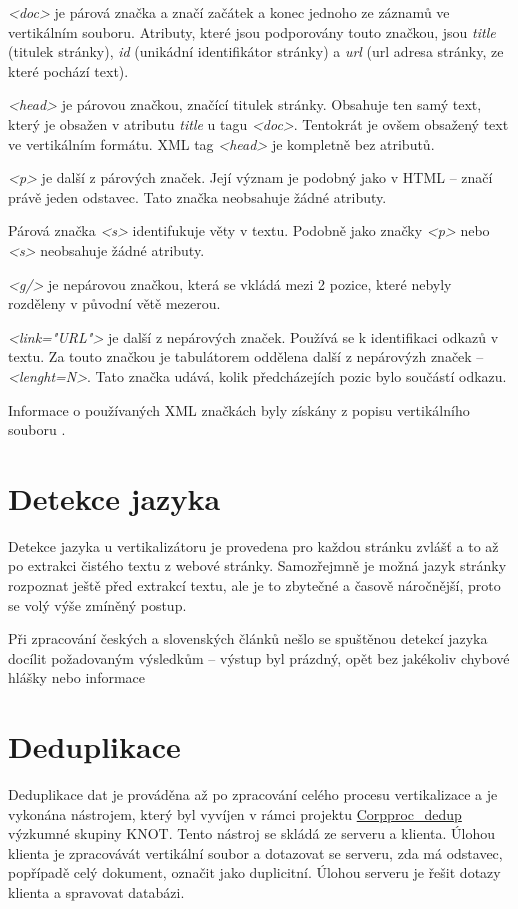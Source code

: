 \textit{<doc>} je párová značka a značí začátek a konec jednoho ze záznamů ve vertikálním souboru.
Atributy, které jsou podporovány touto značkou, jsou \textit{title} (titulek stránky),
\textit{id} (unikádní identifikátor stránky) a \textit{url} (url adresa stránky, ze které pochází text).

\textit{<head>} je párovou značkou, značící titulek stránky. Obsahuje ten samý text, který je obsažen v atributu
\textit{title} u tagu \textit{<doc>}. Tentokrát je ovšem obsažený text ve vertikálním formátu. XML tag
\textit{<head>} je kompletně bez atributů.

\textit{<p>} je další z párových značek. Její význam je podobný jako v HTML -- značí právě jeden odstavec.
Tato značka neobsahuje žádné atributy.

Párová značka \textit{<s>} identifukuje věty v textu. Podobně jako značky \textit{<p>} nebo \textit{<s>}
neobsahuje žádné atributy.

\textit{<g/>} je nepárovou značkou, která se vkládá mezi 2 pozice, které nebyly rozděleny v původní větě
mezerou.

\textit{<link="URL"\textgreater} je další z nepárových značek. Používá se k identifikaci odkazů v textu. Za touto
značkou je tabulátorem oddělena další z nepárovýzh značek -- \textit{<lenght=N>}. Tato značka
udává, kolik předcházejích pozic bylo součástí odkazu.

Informace o používaných XML značkách byly získány z popisu vertikálního souboru \cite{VERTIKAL}.

\section{Detekce jazyka}
Detekce jazyka u vertikalizátoru je provedena pro každou stránku zvlášť a to až po extrakci čistého textu z webové stránky.
Samozřejmně je možná jazyk stránky rozpoznat ještě před extrakcí textu, ale je to zbytečné a časově náročnější,
proto se volý výše zmíněný postup.

Při zpracování českých a slovenských článků nešlo se spuštěnou detekcí jazyka docílit požadovaným výsledkům -- výstup
byl prázdný, opět bez jakékoliv chybové hlášky nebo informace

\section{Deduplikace}
Deduplikace dat je prováděna až po zpracování celého procesu vertikalizace a je vykonána nástrojem,
který byl vyvíjen v rámci projektu \href{https://knot.fit.vutbr.cz/wiki/index.php/Corpproc_dedup}{Corpproc\_dedup}
výzkumné skupiny KNOT.
Tento nástroj se skládá ze serveru a klienta. Úlohou klienta je zpracovávát vertikální soubor a dotazovat
se serveru, zda má odstavec, popřípadě celý dokument, označit jako duplicitní. Úlohou serveru je
řešit dotazy klienta a spravovat databázi.

